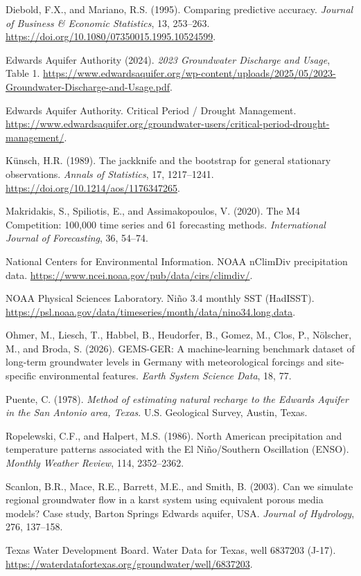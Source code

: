 \documentclass[11pt]{article}
\begin{document}
Diebold, F.X., and Mariano, R.S. (1995). Comparing predictive accuracy. \emph{Journal of Business \& Economic Statistics}, 13, 253--263. \url{https://doi.org/10.1080/07350015.1995.10524599}.

Edwards Aquifer Authority (2024). \emph{2023 Groundwater Discharge and Usage}, Table 1. \url{https://www.edwardsaquifer.org/wp-content/uploads/2025/05/2023-Groundwater-Discharge-and-Usage.pdf}.

Edwards Aquifer Authority. Critical Period / Drought Management. \url{https://www.edwardsaquifer.org/groundwater-users/critical-period-drought-management/}.

Künsch, H.R. (1989). The jackknife and the bootstrap for general stationary observations. \emph{Annals of Statistics}, 17, 1217--1241. \url{https://doi.org/10.1214/aos/1176347265}.

Makridakis, S., Spiliotis, E., and Assimakopoulos, V. (2020). The M4 Competition: 100,000 time series and 61 forecasting methods. \emph{International Journal of Forecasting}, 36, 54--74.

National Centers for Environmental Information. NOAA nClimDiv precipitation data. \url{https://www.ncei.noaa.gov/pub/data/cirs/climdiv/}.

NOAA Physical Sciences Laboratory. Niño 3.4 monthly SST (HadISST). \url{https://psl.noaa.gov/data/timeseries/month/data/nino34.long.data}.

Ohmer, M., Liesch, T., Habbel, B., Heudorfer, B., Gomez, M., Clos, P., Nölscher, M., and Broda, S. (2026). GEMS-GER: A machine-learning benchmark dataset of long-term groundwater levels in Germany with meteorological forcings and site-specific environmental features. \emph{Earth System Science Data}, 18, 77.

Puente, C. (1978). \emph{Method of estimating natural recharge to the Edwards Aquifer in the San Antonio area, Texas}. U.S. Geological Survey, Austin, Texas.

Ropelewski, C.F., and Halpert, M.S. (1986). North American precipitation and temperature patterns associated with the El Niño/Southern Oscillation (ENSO). \emph{Monthly Weather Review}, 114, 2352--2362.

Scanlon, B.R., Mace, R.E., Barrett, M.E., and Smith, B. (2003). Can we simulate regional groundwater flow in a karst system using equivalent porous media models? Case study, Barton Springs Edwards aquifer, USA. \emph{Journal of Hydrology}, 276, 137--158.

Texas Water Development Board. Water Data for Texas, well 6837203 (J-17). \url{https://waterdatafortexas.org/groundwater/well/6837203}.
\end{document}
